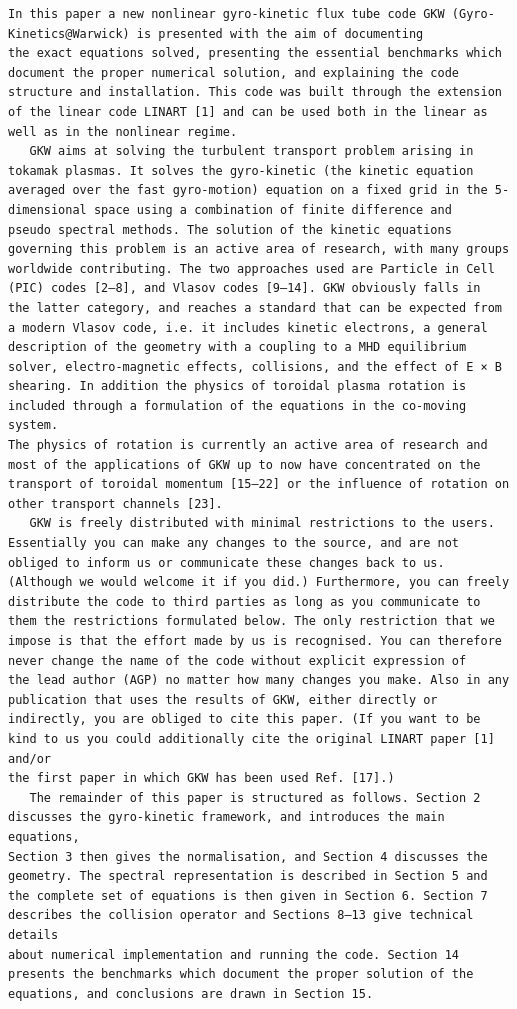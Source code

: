 \documentclass[a4paper]{article}
\newcommand{\gkwpagefont}{\fontsize{6.0pt}{7.55pt}\selectfont}
\begin{document}
\begin{Verbatim}[fontsize=\gkwpagefont]
   In this paper a new nonlinear gyro-kinetic flux tube code GKW (Gyro-Kinetics@Warwick) is presented with the aim of documenting
the exact equations solved, presenting the essential benchmarks which document the proper numerical solution, and explaining the code
structure and installation. This code was built through the extension of the linear code LINART [1] and can be used both in the linear as
well as in the nonlinear regime.
   GKW aims at solving the turbulent transport problem arising in tokamak plasmas. It solves the gyro-kinetic (the kinetic equation
averaged over the fast gyro-motion) equation on a fixed grid in the 5-dimensional space using a combination of finite difference and
pseudo spectral methods. The solution of the kinetic equations governing this problem is an active area of research, with many groups
worldwide contributing. The two approaches used are Particle in Cell (PIC) codes [2–8], and Vlasov codes [9–14]. GKW obviously falls in
the latter category, and reaches a standard that can be expected from a modern Vlasov code, i.e. it includes kinetic electrons, a general
description of the geometry with a coupling to a MHD equilibrium solver, electro-magnetic effects, collisions, and the effect of E × B
shearing. In addition the physics of toroidal plasma rotation is included through a formulation of the equations in the co-moving system.
The physics of rotation is currently an active area of research and most of the applications of GKW up to now have concentrated on the
transport of toroidal momentum [15–22] or the influence of rotation on other transport channels [23].
   GKW is freely distributed with minimal restrictions to the users. Essentially you can make any changes to the source, and are not
obliged to inform us or communicate these changes back to us. (Although we would welcome it if you did.) Furthermore, you can freely
distribute the code to third parties as long as you communicate to them the restrictions formulated below. The only restriction that we
impose is that the effort made by us is recognised. You can therefore never change the name of the code without explicit expression of
the lead author (AGP) no matter how many changes you make. Also in any publication that uses the results of GKW, either directly or
indirectly, you are obliged to cite this paper. (If you want to be kind to us you could additionally cite the original LINART paper [1] and/or
the first paper in which GKW has been used Ref. [17].)
   The remainder of this paper is structured as follows. Section 2 discusses the gyro-kinetic framework, and introduces the main equations,
Section 3 then gives the normalisation, and Section 4 discusses the geometry. The spectral representation is described in Section 5 and
the complete set of equations is then given in Section 6. Section 7 describes the collision operator and Sections 8–13 give technical details
about numerical implementation and running the code. Section 14 presents the benchmarks which document the proper solution of the
equations, and conclusions are drawn in Section 15.


\end{Verbatim}
\end{document}
